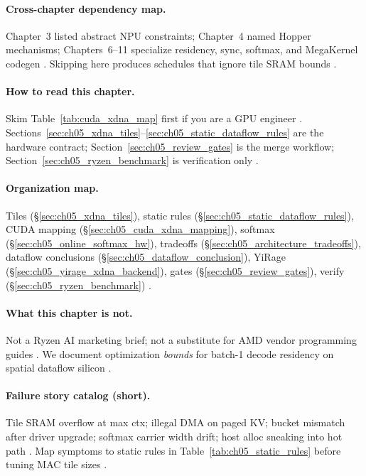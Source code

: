 \paragraph{Cross-chapter dependency map.}
Chapter~3 listed abstract NPU constraints; Chapter~4 named Hopper mechanisms; Chapters~6--11 specialize residency, sync, softmax, and MegaKernel codegen \citep{chen2020compilerbasedhardw,yirage2026,dao2022flashattention}.
Skipping here produces schedules that ignore tile SRAM bounds \citep{amd2024xdna,memoryfloor2026}.

\paragraph{How to read this chapter.}
Skim Table~\ref{tab:cuda_xdna_map} first if you are a GPU engineer \citep{patel2025llminference}.
Sections~\ref{sec:ch05_xdna_tiles}--\ref{sec:ch05_static_dataflow_rules} are the hardware contract; Section~\ref{sec:ch05_review_gates} is the merge workflow; Section~\ref{sec:ch05_ryzen_benchmark} is verification only \citep{yirage2026,taxbreak2026}.

\paragraph{Organization map.}
Tiles (\S\ref{sec:ch05_xdna_tiles}), static rules (\S\ref{sec:ch05_static_dataflow_rules}), CUDA mapping (\S\ref{sec:ch05_cuda_xdna_mapping}), softmax (\S\ref{sec:ch05_online_softmax_hw}), tradeoffs (\S\ref{sec:ch05_architecture_tradeoffs}), dataflow conclusions (\S\ref{sec:ch05_dataflow_conclusion}), YiRage (\S\ref{sec:ch05_yirage_xdna_backend}), gates (\S\ref{sec:ch05_review_gates}), verify (\S\ref{sec:ch05_ryzen_benchmark}) \citep{yirage2026,amd2024xdna}.

\paragraph{What this chapter is not.}
Not a Ryzen AI marketing brief; not a substitute for AMD vendor programming guides \citep{amd2024xdna,amd2024aie}.
We document optimization \emph{bounds} for batch-1 decode residency on spatial dataflow silicon \citep{yirage2026,chen2020compilerbasedhardw,memoryfloor2026}.

\paragraph{Failure story catalog (short).}
Tile SRAM overflow at max ctx; illegal DMA on paged KV; bucket mismatch after driver upgrade; softmax carrier width drift; host alloc sneaking into hot path \citep{yirage2026,amd2024xdna,dao2023flashdecoding,patel2025llminference,kwon2023vllm}.
Map symptoms to static rules in Table~\ref{tab:ch05_static_rules} before tuning MAC tile sizes \citep{memoryfloor2026,taxbreak2026}.

